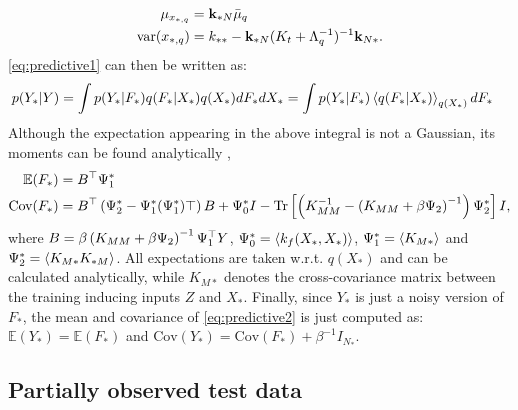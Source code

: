 \documentclass{article} %
\begin{document}
%
\begin{align}
 \mu_{x_{*,q}} = {}& \mathbf{k}_{*N} \bar{\mu}_q \\
  \text{var}(x_{*,q}) = {}& k_{**} - \mathbf{k}_{*N} (K_t + \Lambda_q^{-1})^{-1} \mathbf{k}_{N*}.
\end{align}
%
\eqref{eq:predictive1} can then be written as:
\begin{align} 
p(Y_*| Y) {}& =  \int p(Y_*| F_*)  q(F_*|X_*) q(X_*) d F_* d X_* = \int p(Y_* | F_*) \left\langle q(F_* | X_*) \right\rangle_{q(X_*)} d F_* \label{eq:predictive2}
\end{align}
%
Although the expectation appearing in the above integral is not a Gaussian, its moments can be found analytically \cite{rasmussen-williams, Girard03gaussianprocess},
%
\begin{align}
 \mathbb{E}(F_*) ={}&  B^{\top} \Psi_1^* \label{meanFstar} \\
 \text{Cov}(F_*) ={}& B^{\top} \left( \Psi_2^* - \Psi_1^* (\Psi_1^*){\top} \right) B + \Psi_0^* I - \text{Tr} \left[ \left( K_{MM}^{-1} - \left( K_{MM} + \beta \Psi_2 \right)^{-1} \right) \Psi_2^* \right] I,
\end{align}
%
where $B = \beta \left( K_{MM} + \beta \Psi_2 \right)^{-1} \Psi_1^{\top}
Y$, $\Psi_0^* = \left\langle k_f(X_*, X_*) \right\rangle$, $\Psi_1^* = \left\langle K_{M*} \right\rangle$
and $\Psi_2^* = \left\langle K_{M*} K_{*M} \right\rangle$. All expectations are taken
w.r.t. $q(X_*)$ and can be calculated analytically, while $K_{M*}$
denotes the cross-covariance matrix between the training inducing
inputs $Z$ and $X_*$. Finally, since $Y_*$ is just a noisy version of
$F_*$, the mean and covariance of \eqref{eq:predictive2} is just
computed as: $\mathbb{E}(Y_*) = \mathbb{E}(F_*)$ and $\text{Cov}(Y_*)
= \text{Cov}(F_*) + \beta^{-1} I_{N_*}$.


\subsection{Partially observed test data}
\end{document}
